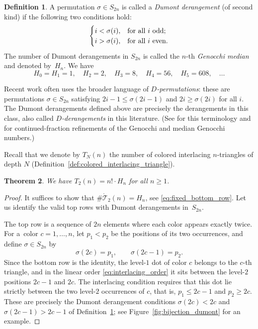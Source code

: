 \documentclass[10pt,a4paper]{amsart}
\numberwithin{equation}{section}
\newtheorem{Theorem}{Theorem}[section]
\theoremstyle{definition}
\newtheorem{Definition}[Theorem]{Definition}
\begin{document}
\begin{Definition}\label{def:derrangement} A permutation $\sigma\in S_{2n}$ is called a
	\emph{Dumont derangement} (of second kind) if the following two conditions
	hold:
	\begin{equation*}
		\begin{cases}
			i< \sigma(i), & \textnormal{for all $i$ odd};			\\
			i> \sigma(i), & \textnormal{for all $i$ even}.
		\end{cases}
	\end{equation*}
	The number of Dumont derangements in $S_{2n}$ is called the $n$-th
	\emph{Genocchi median} and denoted by~$H_n$.
	We have
	\begin{equation*}
		H_0=H_1=1,\quad H_2=2,\quad H_3=8,\quad H_4=56,\quad H_5=608,\quad
		\dots
	\end{equation*}
\end{Definition}

Recent work often uses the broader language of \emph{$D$-permutations}: these
are permutations $\sigma\in S_{2n}$ satisfying $2i-1\le\sigma(2i-1)$ and
$2i\ge\sigma(2i)$ for all $i$.
The Dumont derangements defined above are precisely the derangements in this
class, also called \emph{$D$-derangements} in this literature. (See
\cite{LazarWachs2019} for this terminology and \cite{DebSokal2024} for
continued-fraction refinements of the Genocchi and median Genocchi numbers.)

Recall that we denote by $T_N(n)$ the number of colored interlacing
$n$-triangles of depth $N$ (Definition~\ref{def:colored_interlacing_triangle}).

\begin{Theorem}
	\label{thm:Genocchi_counts} We have $T_2(n)=n!\cdot H_n$ for all $n\geq 1$.
\end{Theorem}
\begin{proof}
	It suffices to show that $\# \mathring{\mathcal{T}}_2(n) = H_n$, see
	\eqref{eq:fixed_bottom_row}.
	Let us identify the valid top rows with Dumont derangements in~$S_{2n}$.

	The top row is a sequence of $2n$ elements where each color appears exactly
	twice.
	For a~color $c=1,\dots,n $, let $p_1 < p_2$ be the positions of its two
	occurrences, and define $\sigma \in S_{2n}$ by
	\begin{equation*}
		\sigma(2c) = p_1, \qquad \sigma(2c-1) = p_2.
	\end{equation*}
	Since the bottom row is the identity, the level-$1$ dot of color $c$
	belongs to the $c$-th triangle, and in the linear order
	\eqref{eq:interlacing_order} it sits between the level-$2$ positions
	$2c-1$ and $2c$.
	The interlacing condition requires that this dot lie strictly between the
	two level-$2$ occurrences of $c$, that is, $p_1 \le 2c-1$ and
	$p_2 \ge 2c$.
	These are precisely the Dumont derangement conditions $\sigma(2c) < 2c$
	and $\sigma(2c-1) > 2c-1$ of Definition~\ref{def:derrangement}; see
	Figure~\ref{fig:bijection_dumont} for an example.
\end{proof}
\end{document}
